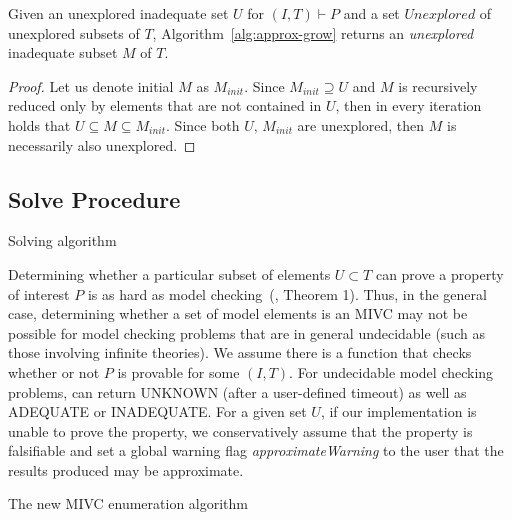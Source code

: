 \begin{proposition}
Given an unexplored inadequate set $U$ for $(I,T) \vdash P$ and a set $\mathit{Unexplored}$ of unexplored subsets of $T$, Algorithm~\ref{alg:approx-grow} returns an \emph{unexplored} inadequate subset $M$ of $T$.
\end{proposition}

\begin{proof}
Let us denote initial $M$ as $M_{init}$. Since $M_{init} \supseteq U$ and $M$ is recursively reduced only by elements that are not contained in $U$, then in every iteration holds that $U \subseteq M \subseteq M_{init}$. Since both $U, \, M_{init}$ are unexplored, then $M$ is necessarily also unexplored.
\end{proof}

\subsection{Solve Procedure}

\begin{algorithm}[t]

\caption{Solving algorithm}
\label{alg:solve}
\end{algorithm}

Determining whether a particular subset of elements $U \subset T$ can prove a property of interest $P$ is as hard as model checking~(\cite{Ghass16}, Theorem 1).  Thus, in the general case, determining whether a set of model elements is an MIVC may not be possible for model checking problems that are in general undecidable (such as those involving infinite theories).  We assume there is a function \CheckAdq that checks
whether or not $P$ is provable for some $(I, T)$.  For undecidable
model checking problems, \CheckAdq can return UNKNOWN
(after a user-defined timeout) as well as ADEQUATE
or INADEQUATE.  For a given set $U$, if our implementation is
unable to prove the property, we conservatively assume that
the property is falsifiable and set a global warning flag {\em approximateWarning} to the
user that the results produced may be approximate.  
 
% 


\begin{algorithm}[H]

\caption{The new MIVC enumeration algorithm}
\label{alg:allmivc}
\end{algorithm}


